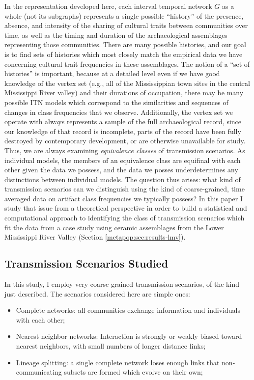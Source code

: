     In the representation developed here, each interval temporal network \(G\) as a whole (not its subgraphs) represents a single possible ``history'' of the presence, absence, and intensity of the sharing of cultural traits between communities over time, as well as the timing and duration of the archaeological assemblages representing those communities.  There are many possible histories, and our goal is to find sets of histories which most closely match the empirical data we have concerning cultural trait frequencies in these assemblages.  The notion of a ``set of histories'' is important, because at a detailed level even if we have good knowledge of the vertex set (e.g., all of the Mississippian town sites in the central Mississippi River valley) and their durations of occupation, there may be many possible ITN models which correspond to the similarities and sequences of changes in class frequencies that we observe.  Additionally, the vertex set we operate with always represents a sample of the full archaeological record, since our knowledge of that record is incomplete, parts of the record have been fully destroyed by contemporary development, or are otherwise unavailable for study.  Thus, we are always examining \emph{equivalence classes} of transmission scenarios.  As individual models, the members of an equivalence class are equifinal with each other given the data we possess, and the data we posses underdetermines any distinctions between individual models.  
    The question thus arises:  what kind of transmission scenarios can we distinguish using the kind of coarse-grained, time averaged data on artifact class frequencies we typically possess?  In this paper I study that issue from a theoretical perspective in order to build a statistical and computational approach to identifying the class of transmission scenarios which fit the data from a case study using ceramic assemblages from the Lower Mississippi River Valley (Section \ref{metapop:sec:results-lmv}).  
    
    \subsection{Transmission Scenarios Studied}\label{metapop:sec:transmission-scenarios}
    
    In this study, I employ very coarse-grained transmission scenarios, of the kind just described.  The scenarios considered here are simple ones:
    
    \begin{itemize}
        \item Complete networks:  all communities exchange information and individuals with each other;
        \item Nearest neighbor networks:  Interaction is strongly or weakly biased toward nearest neighbors, with small numbers of longer distance links;
        \item Lineage splitting:  a single complete network loses enough links that non-communicating subsets are formed which evolve on their own;
    \end{itemize}
    
